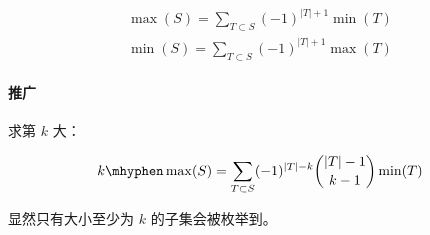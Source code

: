 $$ \begin{aligned} \max(S)=\sum_{T \subset S}(-1)^{|T|+1}\min(T) \\ \min(S)=\sum_{T \subset S}(-1)^{|T|+1}\max(T) \end{aligned} $$

\paragraph{推广} 求第 $k$ 大：

$$ k\mhyphen\max(S) = \sum_{T \subset S} (-1)^{|T|-k} {|T|-1 \choose k-1} \min(T) $$

显然只有大小至少为 $k$ 的子集会被枚举到。
